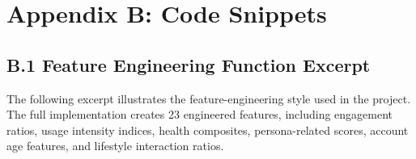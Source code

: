 \documentclass[12pt,a4paper]{article}
\begin{document}
\newpage
 
\section{Appendix B: Code Snippets}
 
\subsection*{B.1 Feature Engineering Function Excerpt}
 
The following excerpt illustrates the feature-engineering style used in the project. The full implementation creates 23 engineered features, including engagement ratios, usage intensity indices, health composites, persona-related scores, account age features, and lifestyle interaction ratios.
 
\end{document}
